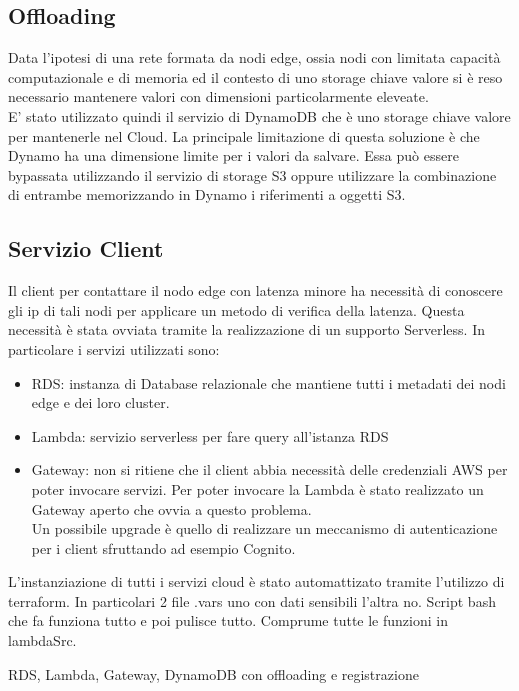 \documentclass[conference]{IEEEtran}
\begin{document}
\subsection{Offloading}
Data l'ipotesi di una rete formata da nodi edge, ossia nodi con limitata capacità computazionale e di memoria ed il contesto
di uno storage chiave valore si è reso necessario mantenere valori con dimensioni particolarmente eleveate.\\
E' stato utilizzato quindi il servizio di DynamoDB che è uno storage chiave valore per mantenerle nel Cloud.
La principale limitazione di questa soluzione è che Dynamo ha una dimensione limite per i valori da salvare.
Essa può essere bypassata utilizzando il servizio di storage S3 oppure utilizzare la combinazione di entrambe memorizzando in Dynamo
i riferimenti a oggetti S3.

\subsection{Servizio Client}
Il client per contattare il nodo edge con latenza minore ha necessità di conoscere gli ip di tali nodi per applicare un
metodo di verifica della latenza. Questa necessità è stata ovviata tramite la realizzazione di un supporto Serverless.
In particolare i servizi utilizzati sono:
\begin{itemize}
  \item {RDS: }instanza di Database relazionale che mantiene tutti i metadati dei nodi edge e dei loro cluster.
  \item {Lambda: }servizio serverless per fare query all'istanza RDS
  \item {Gateway: }non si ritiene che il client abbia necessità delle credenziali AWS per poter invocare servizi. Per poter
                  invocare la Lambda è stato realizzato un Gateway aperto che ovvia a questo problema.\\
                  Un possibile upgrade è quello di realizzare un meccanismo di autenticazione per i client sfruttando
                  ad esempio Cognito.
\end{itemize}

L'instanziazione di tutti i servizi cloud è stato automattizato tramite l'utilizzo di terraform. In particolari 2 file .vars
uno con dati sensibili l'altra no. Script bash che fa funziona tutto e poi pulisce tutto. Comprume tutte le funzioni in lambdaSrc.


RDS, Lambda, Gateway, DynamoDB con offloading e registrazione
\end{document}
